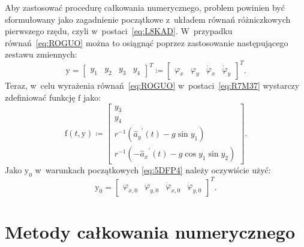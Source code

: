 \documentclass[paper=a4,DIV=12]{lpas}
\newcommand{\brm}[1]{\bm{\mathrm{#1}}}
\begin{document}
\begin{appendices}
Aby zastosować procedurę całkowania numerycznego, problem powinien być
sformułowany jako zagadnienie początkowe z~układem równań różniczkowych
pierwszego rzędu, czyli w~postaci~\eqref{eq:L8KAD}. W~przypadku
równań~\eqref{eq:ROGUO} można to osiągnąć poprzez zastosowanie następującego
zestawu zmiennych:
\begin{equation}
  \brm{y} = \begin{bmatrix}
    y_1 & y_2 & y_3 & y_4
  \end{bmatrix}^T \coloneqq \begin{bmatrix}
    \varphi_x & \varphi_y & \dot{\varphi}_x & \dot{\varphi}_y
  \end{bmatrix}^T.
  \label{eq:U09S6}
\end{equation}
Teraz, w~celu wyrażenia równań~\eqref{eq:ROGUO} w~postaci~\eqref{eq:R7M37}
wystarczy zdefiniować funkcję $\brm{f}$ jako:
\begin{equation}
  \brm{f}\left(t,\brm{y}\right) \coloneqq \begin{bmatrix}
    y_3 \\
    y_4 \\
    r^{-1} \left( {\hat{a}_y}^{\prime}\left(t\right) - g \sin{y_1} \right)  \\
    r^{-1} \left(-{\hat{a}_x}^{\prime}\left(t\right) - g \cos{y_1}\sin{y_2} \right)
  \end{bmatrix}.
  \label{eq:S8LTL}
\end{equation}
Jako $\brm{y}_0$ w~warunkach początkowych \eqref{eq:5DFP4} należy oczywiście
użyć:
\begin{equation}
  \brm{y}_0 = \begin{bmatrix}
    \varphi_{x,0} & \varphi_{y,0} & \dot{\varphi}_{x,0} & \dot{\varphi}_{y,0}
  \end{bmatrix}^T.
\end{equation}

\section{Metody całkowania numerycznego}
\label{sec:VNLHT}


\end{appendices}
\end{document}
